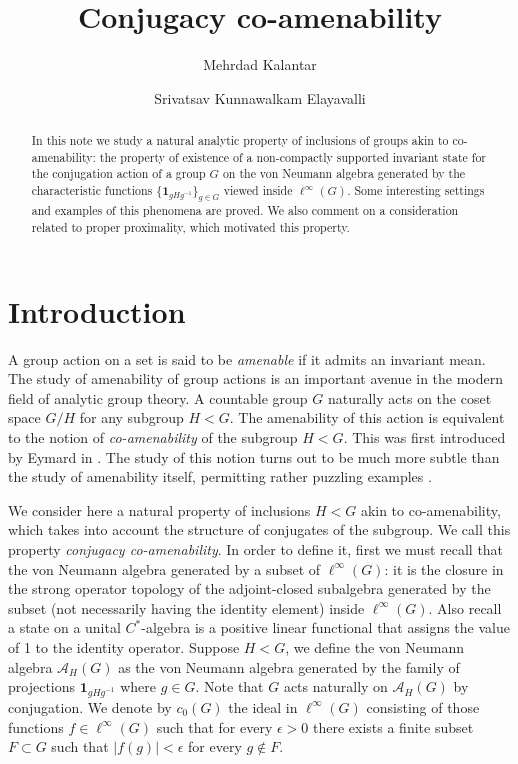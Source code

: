 \documentclass[11pt]{amsart}
\title{Conjugacy co-amenability}
\author{Mehrdad Kalantar}
\author{Srivatsav Kunnawalkam Elayavalli}
\theoremstyle{definition}
\begin{document}
%
\begin{abstract}
In this note we study a natural analytic property of inclusions of groups akin to co-amenability: the property of existence of a non-compactly supported invariant state for the conjugation action of a group $G$ on the von Neumann algebra generated by the characteristic functions $\{\mathbf{1}_{gHg^{-1}}\}_{g\in G}$ viewed inside $\ell^\infty(G)$.  Some interesting settings and examples of this phenomena are proved. We also comment on a consideration related to proper proximality, which motivated this property.  

\end{abstract}

%

\maketitle

\section{Introduction}

A group action on a set is said to be \emph{amenable} if it admits an invariant mean. The study of amenability of group actions is an important avenue in the modern field of analytic group theory. A countable group $G$ naturally acts on the coset space $G/H$ for any subgroup $H<G$. The amenability of this action is equivalent to the notion of \emph{co-amenability} of the subgroup $H<G$. This was first introduced by Eymard in \cite{Eymard}. The study of this notion turns out to be much more subtle than the study of amenability itself, permitting rather puzzling examples \cite{monodpopa}. 

We consider here a natural property of inclusions $H<G$ akin to co-amenability, which takes into account the structure of conjugates of the subgroup. We call this property \emph{conjugacy co-amenability}. In order to define it, first we must recall that the von Neumann algebra generated by a subset of $\ell^\infty(G)$: it is the closure in the strong operator topology of the adjoint-closed subalgebra generated by the subset (not necessarily having the identity element) inside $\ell^\infty(G)$. Also recall a state on a unital $C^*$-algebra is a positive linear functional that assigns the value of 1 to the identity operator. Suppose $H<G$, we define the von Neumann algebra $\mathcal{A}_H(G)$ as the von Neumann algebra generated by the family of projections $\mathbf{1}_{gHg^{-1}}$ where $g\in G$.  Note that $G$ acts naturally on $\mathcal{A}_H(G)$ by conjugation. We denote by $c_0(G)$ the ideal in $\ell^\infty(G)$ consisting of those functions $f\in \ell^\infty(G)$ such that for every $\epsilon>0$ there exists a finite subset $F\subset G$ such that $|f(g)|<\epsilon$ for every $g\notin F$. 
\end{document}
